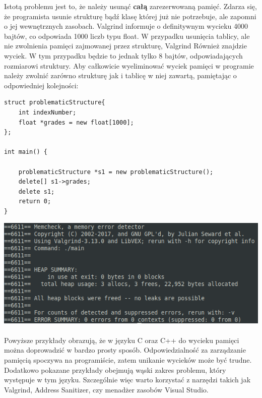 \documentclass[12pt]{article}
\begin{document}
Istotą problemu jest to, że należy usunąć \textbf{całą} zarezerwowaną pamięć. Zdarza się, że programista usunie strukturę bądź klasę której już nie potrzebuje, ale zapomni o jej wewnętrznych zasobach. Valgrind informuje o definitywnym wycieku 4000 bajtów, co odpowiada 1000 liczb typu float. W przypadku usunięcia tablicy, ale nie zwolnienia pamięci zajmowanej przez strukturę, Valgrind Również znajdzie wyciek. W tym przypadku będzie to jednak tylko 8 bajtów, odpowiadających rozmiarowi struktury.
\newpage
\noindent
Aby całkowicie wyeliminować wyciek pamięci w programie należy zwolnić zarówno strukturę jak i tablicę w niej zawartą, pamiętając o odpowiedniej kolejności: 
\begin{lstlisting}
struct problematicStructure{
    int indexNumber;
    float *grades = new float[1000];
};

int main() {

    problematicStructure *s1 = new problematicStructure();
    delete[] s1->grades;
    delete s1;
    return 0;
}
\end{lstlisting}
\includegraphics[scale=0.7]{cpp2nlVal} \\\\
Powyższe przykłady obrazują, że w języku C oraz C++ do wycieku pamięci można doprowadzić w bardzo prosty sposób. Odpowiedzialność za zarządzanie pamięcią spoczywa na programiście, zatem unikanie wycieków może być trudne. Dodatkowo pokazane przykłady obejmują wąski zakres problemu, który występuje w tym języku. Szczególnie więc warto korzystać z narzędzi takich jak Valgrind, Address Sanitizer, czy menadżer zasobów Visual Studio.
\newpage
\noindent
\end{document}

